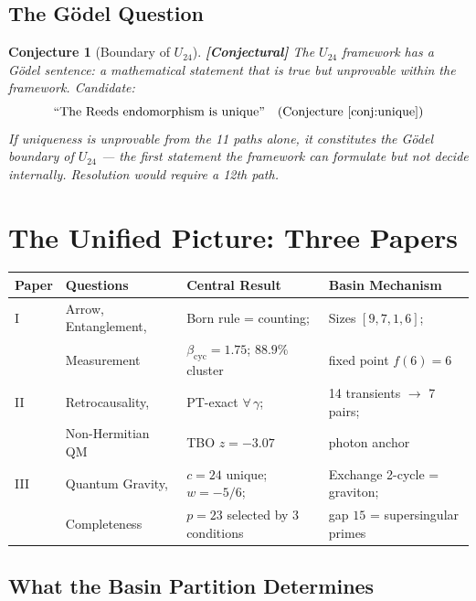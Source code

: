 \documentclass[12pt,a4paper]{article}
\newcommand{\conjectural}[1]{\textcolor{conjectural}{\textbf{[Conjectural]}} #1}
\newtheorem{conjecture}[theorem]{Conjecture}
\theoremstyle{definition}\newtheorem{definition}[theorem]{Definition}
\theoremstyle{remark}\newtheorem{remark}[theorem]{Remark}
\begin{document}
\subsection{The G\"odel Question}

\begin{conjecture}[Boundary of $U_{24}$]
\label{conj:godel}
\conjectural{The $U_{24}$ framework has a G\"odel sentence: a mathematical
statement that is true but unprovable within the framework. Candidate:}
\begin{equation}
  \text{``The Reeds endomorphism is unique''} \quad (\text{Conjecture~\ref{conj:unique}})
\end{equation}
If uniqueness is unprovable from the 11 paths alone, it constitutes the G\"odel
boundary of $U_{24}$ --- the first statement the framework can formulate but
not decide internally. Resolution would require a 12th path.
\end{conjecture}

\section{The Unified Picture: Three Papers}
\label{sec:unified}

\begin{center}
\begin{tabular}{llll}
\toprule
\textbf{Paper} & \textbf{Questions} & \textbf{Central Result} & \textbf{Basin Mechanism} \\
\midrule
I & Arrow, Entanglement, & Born rule = counting; & Sizes $[9,7,1,6]$; \\
  & Measurement & $\beta_{\mathrm{cyc}} = 1.75$; $88.9\%$ cluster & fixed point $f(6) = 6$ \\
\midrule
II & Retrocausality, & PT-exact $\forall\,\gamma$; & 14 transients $\to$ 7 pairs; \\
   & Non-Hermitian QM & TBO $z = -3.07$ & photon anchor \\
\midrule
III & Quantum Gravity, & $c = 24$ unique; $w = -5/6$; & Exchange 2-cycle = graviton; \\
    & Completeness & $p = 23$ selected by 3 conditions & gap $15$ = supersingular primes \\
\bottomrule
\end{tabular}
\end{center}

\subsection{What the Basin Partition Determines}
\end{document}
